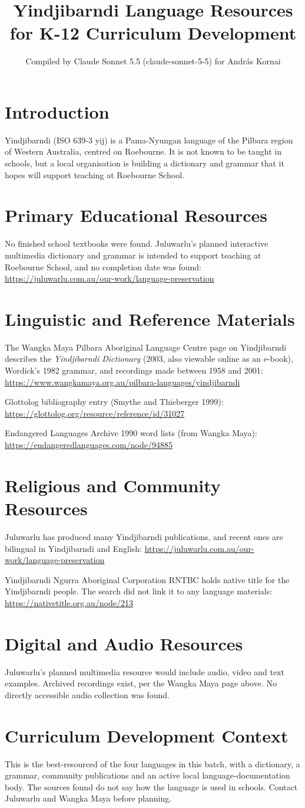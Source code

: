 \documentclass[12pt]{article}
\title{Yindjibarndi Language Resources for K-12 Curriculum Development}
\author{Compiled by Claude Sonnet 5.5 (claude-sonnet-5-5) for Andr\'as Kornai}
\date{}
\begin{document}
\maketitle
\section{Introduction}
Yindjibarndi (ISO 639-3 yij) is a Pama-Nyungan language of the Pilbara region of Western Australia, centred on Roebourne. It is not known to be taught in schools, but a local organisation is building a dictionary and grammar that it hopes will support teaching at Roebourne School.
\section{Primary Educational Resources}
No finished school textbooks were found. Juluwarlu's planned interactive multimedia dictionary and grammar is intended to support teaching at Roebourne School, and no completion date was found: \url{https://juluwarlu.com.au/our-work/language-preservation}
\section{Linguistic and Reference Materials}
The Wangka Maya Pilbara Aboriginal Language Centre page on Yindjibarndi describes the \emph{Yindjibarndi Dictionary} (2003, also viewable online as an e-book), Wordick's 1982 grammar, and recordings made between 1958 and 2001: \url{https://www.wangkamaya.org.au/pilbara-languages/yindjibarndi}

Glottolog bibliography entry (Smythe and Thieberger 1999): \url{https://glottolog.org/resource/reference/id/31027}

Endangered Languages Archive 1990 word lists (from Wangka Maya): \url{https://endangeredlanguages.com/node/94885}
\section{Religious and Community Resources}
Juluwarlu has produced many Yindjibarndi publications, and recent ones are bilingual in Yindjibarndi and English: \url{https://juluwarlu.com.au/our-work/language-preservation}

Yindjibarndi Ngurra Aboriginal Corporation RNTBC holds native title for the Yindjibarndi people. The search did not link it to any language materials: \url{https://nativetitle.org.au/node/213}
\section{Digital and Audio Resources}
Juluwarlu's planned multimedia resource would include audio, video and text examples. Archived recordings exist, per the Wangka Maya page above. No directly accessible audio collection was found.
\section{Curriculum Development Context}
This is the best-resourced of the four languages in this batch, with a dictionary, a grammar, community publications and an active local language-documentation body. The sources found do not say how the language is used in schools. Contact Juluwarlu and Wangka Maya before planning.
\end{document}

